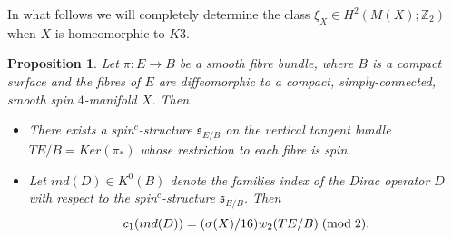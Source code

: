 \documentclass{amsart}
\newtheorem{proposition}[theorem]{Proposition}
\theoremstyle{definition}
\theoremstyle{remark}
\numberwithin{equation}{section}
\begin{document}
In what follows we will completely determine the class $\xi_X \in H^2( M(X) ; \mathbb{Z}_2)$ when $X$ is homeomorphic to $K3$.

\begin{proposition}\label{prop:w2}
Let $\pi : E \to B$ be a smooth fibre bundle, where $B$ is a compact surface and the fibres of $E$ are diffeomorphic to a compact, simply-connected, smooth spin $4$-manifold $X$. Then
\begin{itemize}
\item[(1)]{There exists a spin$^c$-structure $\mathfrak{s}_{E/B}$ on the vertical tangent bundle $TE/B = Ker(\pi_*)$ whose restriction to each fibre is spin.}
\item[(2)]{Let $ind(D) \in K^0(B)$ denote the families index of the Dirac operator $D$ with respect to the spin$^c$-structure $\mathfrak{s}_{E/B}$. Then 
\[
c_1( ind(D) ) = (\sigma(X)/16) w_2( TE/B ) \; ({\rm mod} \; 2).
\]}
\end{itemize}
\end{proposition}
\end{document}
